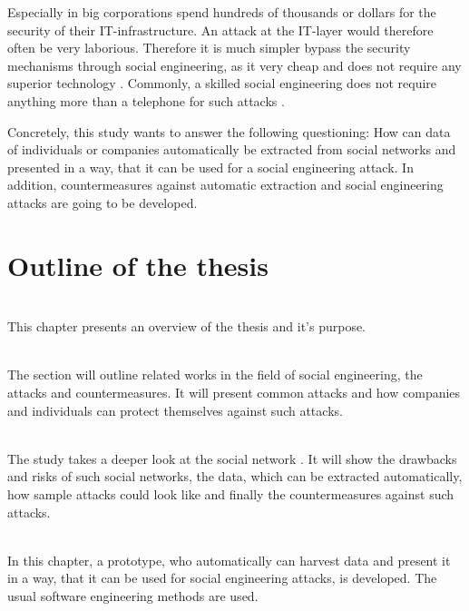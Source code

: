 Especially in big corporations spend hundreds of thousands or dollars for the
security of their IT-infrastructure. An attack at the IT-layer would therefore
often be very laborious. Therefore it is much simpler bypass the security
mechanisms through social engineering, as it very cheap and does not require
any superior technology \cite{winkler1995}. Commonly, a skilled social
engineering does not require anything more than a telephone for such attacks
\cite{mitnick2003}.

Concretely, this study wants to answer the following questioning:
How can data of individuals or companies automatically be extracted
from social networks and presented in a way, that it can be used for a social
engineering attack. In addition, countermeasures against automatic extraction
and social engineering attacks are going to be developed.

\newpage
\section{Outline of the thesis}

\vspace{0.5em}\\
\noindent This chapter presents an overview of the thesis and it's purpose.

\vspace{0.5em}\\
\noindent The section will outline related works in the field of social
engineering, the attacks and countermeasures. It will present common attacks
and how companies and individuals can protect themselves against such attacks.

\vspace{0.5em}\\
\noindent The study takes a deeper look at the social network \Twitter. It will
show the drawbacks and risks of such social networks, the data, which can be
extracted automatically, how sample attacks could look like and finally the
countermeasures against such attacks.

\vspace{0.5em}\\
\noindent In this chapter, a prototype, who automatically can harvest data and
present it in a way, that it can be used for social engineering attacks, is
developed. The usual software engineering methods are used.

